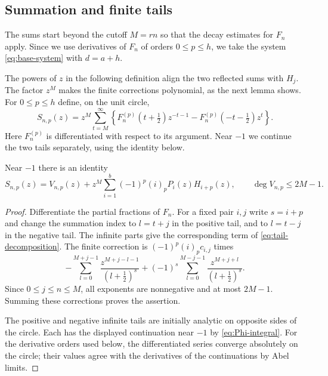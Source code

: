 \subsection{Summation and finite tails}

The sums start beyond the cutoff $M=rn$ so that the decay estimates
for $F_n$ apply. Since we use derivatives of $F_n$ of orders
$0\leq p\leq h$, we take the system \eqref{eq:base-system} with $d=a+h$.

The powers of $z$ in the following definition align the two reflected
sums with $H_j$. The factor $z^M$ makes the finite corrections polynomial,
as the next lemma shows.
For $0\leq p\leq h$ define, on the unit circle,
\begin{equation}\label{eq:S}
 S_{n,p}(z)=z^M\sum_{t=M}^{\infty}
 \left\{F_n^{(p)}(t+\tfrac12)z^{-t-1}
              -F_n^{(p)}(-t-\tfrac12)z^t\right\}.
\end{equation}
Here $F_n^{(p)}$ is differentiated with respect to its argument.
Near $-1$ we continue the two tails separately, using the identity below.

\begin{lemma}\label{lem:tail}
Near $-1$ there is an identity
\begin{equation}\label{eq:tail-decomposition}
 S_{n,p}(z)=V_{n,p}(z)
      +z^M\sum_{i=1}^b(-1)^p(i)_p P_i(z)H_{i+p}(z),
 \qquad \deg V_{n,p}\leq2M-1.
\end{equation}
\end{lemma}

\begin{proof}
Differentiate the partial fractions of $F_n$. For a fixed pair $i,j$
write $s=i+p$ and change the summation index to $l=t+j$ in the positive
tail, and to $l=t-j$ in the negative tail. The infinite parts give the
corresponding term of \eqref{eq:tail-decomposition}. The finite correction
is $(-1)^p(i)_p c_{i,j}$ times
\begin{equation}\label{eq:finite-correction}
 -\sum_{l=0}^{M+j-1}\frac{z^{M+j-l-1}}{(l+\tfrac12)^s}
 +(-1)^s\sum_{l=0}^{M-j-1}\frac{z^{M+j+l}}{(l+\tfrac12)^s}.
\end{equation}
Since $0\leq j\leq n\leq M$, all exponents are nonnegative and at most
$2M-1$. Summing these corrections proves the assertion.

The positive and negative infinite tails are initially analytic on
opposite sides of the circle. Each has the displayed continuation near
$-1$ by \eqref{eq:Phi-integral}. For the derivative orders used below,
the differentiated series converge absolutely on the circle; their
values agree with the derivatives of the continuations by Abel limits.
\end{proof}

